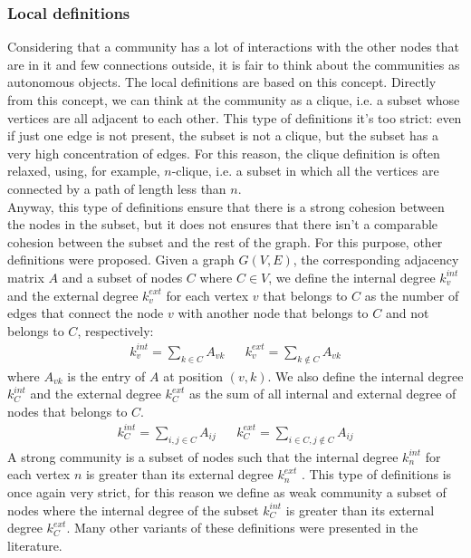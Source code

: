 \subsubsection{Local definitions}\label{local-def}
Considering that a community has a lot of interactions with the other nodes that are in it and few connections outside, it is fair to think about the communities as autonomous objects.
The local definitions are based on this concept. Directly from this concept, we can think at the community as a clique, i.e. a subset whose vertices are all adjacent to each other. This type of definitions it's too strict: even if just one edge is not present, the subset is not a clique, but the subset has a very high concentration of edges. For this reason, the clique definition is often relaxed, using, for example, $n$-clique, i.e. a subset in which all the vertices are connected by a path of length less than $n$.\\
Anyway, this type of definitions ensure that there is a strong cohesion between the nodes in the subset, but it does not ensures that there isn't a comparable cohesion between the subset and the rest of the graph. For this purpose, other definitions were proposed. 
Given a graph $G(V,E)$, the corresponding adjacency matrix $A$ and a subset of nodes $C$ where $C \in V$, we define the internal degree $k_v^{int}$ and the external degree $k_v^{ext}$ for each vertex $v$ that belongs to $C$ as the number of edges that connect the node $v$ with another node that belongs to $C$ and not belongs to $C$, respectively:
\begin{align}
k_v^{int}= \sum_{k \in C} A_{vk} && k_v^{ext}= \sum_{k \notin C} A_{vk}
\end{align}
where $A_{vk}$ is the entry of $A$ at position $(v,k)$. We also define the internal degree $k_C^{int}$ and the external degree $k_C^{ext}$ as the sum of all internal and external degree of nodes that belongs to $C$. 
\begin{align}
k_C^{int}= \sum_{i,j \in C} A_{ij} && k_C^{ext}= \sum_{i\in C, j \notin C} A_{ij}
\end{align}
A strong community is a subset of nodes such that the internal degree $k_n^{int}$  for each vertex $n$ is greater than its external degree $k_n^{ext}$ . This type of definitions is once again very strict, for this reason we define as weak community a subset of nodes where the internal degree of the subset  $k_C^{int}$ is greater than its external degree $k_C^{ext}$. Many other variants of these definitions were presented in the literature.
